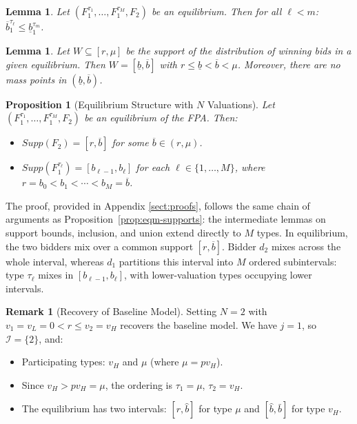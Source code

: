 \documentclass[11pt]{article}
\theoremstyle{plain}
\theoremstyle{definition}
\newtheorem{rem}[thm]{Remark}
\theoremstyle{plain}
\theoremstyle{plain}
\theoremstyle{plain}
\newtheorem{lem}[thm]{Lemma}
\theoremstyle{plain}
\newtheorem{prop}[thm]{Proposition}
\numberwithin{equation}{section}
\begin{document}
\vspace{0.2cm}

\begin{lem}\label{lem:N-monotonicity}
Let $(F_1^{\tau_1}, \ldots, F_1^{\tau_M}, F_2)$ be an equilibrium. Then for all $\ell < m$: $\overline{b}_1^{\tau_\ell} \leq \underline{b}_1^{\tau_m}$.
\end{lem}

\begin{lem}\label{lem:N-interval}
Let $W \subseteq [r, \mu]$ be the support of the distribution of winning bids in a given equilibrium. Then $W = [\underline{b}, \overline{b}]$ with $r \leq \underline{b} < \overline{b} < \mu$. Moreover, there are no mass points in $(\underline{b}, \overline{b})$.
\end{lem}

\vspace{0.2cm}

\begin{prop}[Equilibrium Structure with $N$ Valuations] \label{prop:N-val-structure}
Let $(F_1^{\tau_1}, \ldots, F_1^{\tau_M}, F_2)$ be an equilibrium of the FPA. Then:
\begin{itemize}
    \item[-] $Supp(F_2) = [r, \overline{b}]$ for some $\overline{b} \in (r, \mu)$.

    \vspace{0.1cm}

    \item[-] $Supp(F_1^{\tau_\ell}) = [b_{\ell-1}, b_\ell]$ for each $\ell \in \{1, \ldots, M\}$, where $r = b_0 < b_1 < \cdots < b_M = \overline{b}$.
\end{itemize}
\end{prop}

\noindent The proof, provided in Appendix \ref{sect:proofs}, follows the same chain of arguments as Proposition~\ref{prop:eqm-supports}: the intermediate lemmas on support bounds, inclusion, and union extend directly to $M$ types. In equilibrium, the two bidders mix over a common support $[r, \overline{b}]$. Bidder $d_2$ mixes across the whole interval, whereas $d_1$ partitions this interval into $M$ ordered subintervals: type $\tau_\ell$ mixes in $[b_{\ell-1}, b_\ell]$, with lower-valuation types occupying lower intervals.
\vspace{0.2cm}

\begin{rem}[Recovery of Baseline Model]
Setting $N = 2$ with $v_1 = v_L = 0 < r \leq v_2 = v_H$ recovers the baseline model. We have $j = 1$, so $\mathcal{I} = \{2\}$, and:
\begin{itemize}
    \item Participating types: $v_H$ and $\mu$ (where $\mu = pv_H$).
    \item Since $v_H > pv_H = \mu$, the ordering is $\tau_1 = \mu$, $\tau_2 = v_H$.
    \item The equilibrium has two intervals: $[r, \hat{b}]$ for type $\mu$ and $[\hat{b}, \bar{b}]$ for type $v_H$.
\end{itemize}
\end{rem}
\vspace{0.2cm}
\end{document}
